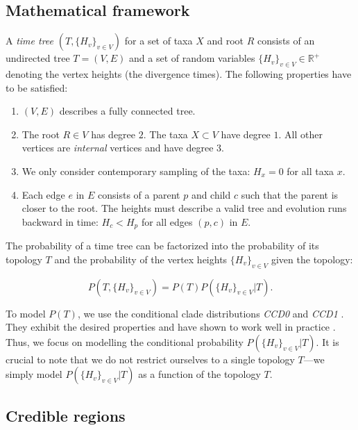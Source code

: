 \documentclass[10pt,letterpaper]{article}
\newcommand{\Pro}[1]{P\left(#1\right)}
\begin{document}
\subsection*{Mathematical framework}

A \emph{time tree} $(T, \{H_v\}_{v \in V})$ for a set of taxa $X$ and root $R$ consists of an undirected tree $T = (V, E)$ and a set of random variables $\{H_v\}_{v \in V} \in \mathbb{R}^+$ denoting the vertex heights (the divergence times). The following properties have to be satisfied:

\begin{enumerate}
	\item $(V, E)$ describes a fully connected tree.
	\item The root $R \in V$ has degree $2$. The taxa $X \subset V$ have degree $1$. All other vertices are \emph{internal} vertices and have degree $3$.
	\item We only consider contemporary sampling of the taxa: $H_x = 0$ for all taxa $x$.
	\item Each edge $e$ in $E$ consists of a parent $p$ and child $c$ such that the parent is closer to the root. The heights must describe a valid tree and evolution runs backward in time: $H_c < H_p$ for all edges $(p, c)$ in $E$.
\end{enumerate}

The probability of a time tree can be factorized into the probability of its topology $T$ and the probability of the vertex heights $\{H_v\}_{v \in V}$ given the topology:

$$
\Pro{T, \{H_v\}_{v \in V}} = \Pro{T} \Pro{\{H_v\}_{v \in V} | T}.
$$

To model $\Pro{T}$, we use the conditional clade distributions \emph{CCD0} and \emph{CCD1} \cite{ccd,ccdlarget}. They exhibit the desired properties and have shown to work well in practice \cite{ccd,ccd0expansion,hipstr}. Thus, we focus on modelling the conditional probability $\Pro{\{H_v\}_{v \in V} | T}$. It is crucial to note that we do not restrict ourselves to a single topology $T$---we simply model $\Pro{\{H_v\}_{v \in V} | T}$ as a function of the topology $T$.

\subsection*{Credible regions}
\end{document}
